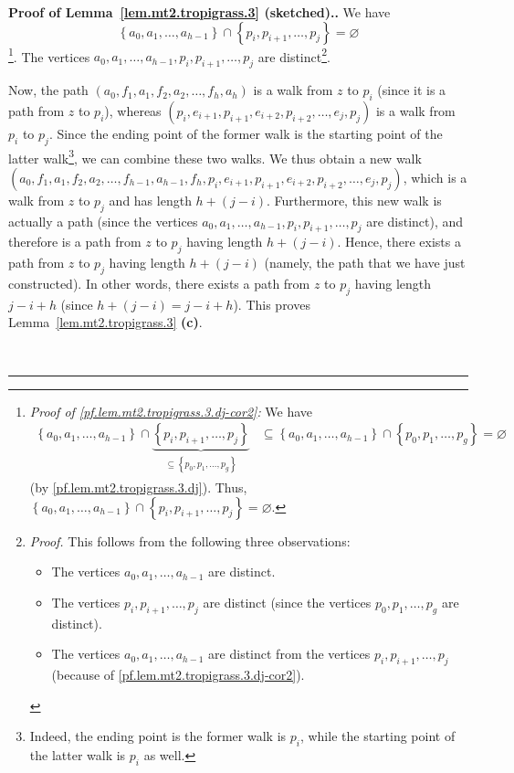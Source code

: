 \documentclass[numbers=enddot,12pt,final,onecolumn,notitlepage]{scrartcl}%
\theoremstyle{definition}
\newenvironment{proof}[1][Proof]{\noindent\textbf{#1.} }{\ \rule{0.5em}{0.5em}}
\newcommand{\set}[1]{\left\{ #1 \right\}}
\newcommand{\tup}[1]{\left( #1 \right)}
\newcommand{\underbrack}[2]{\underbrace{#1}_{\substack{#2}}}
\begin{document}
\begin{proof}[Proof of Lemma~\ref{lem.mt2.tropigrass.3} (sketched).]
We have
\begin{equation}
\set{a_0, a_1, \ldots, a_{h-1}} \cap \set{p_i, p_{i+1}, \ldots, p_j}
= \varnothing
\label{pf.lem.mt2.tropigrass.3.dj-cor2}
\end{equation}
\footnote{\textit{Proof of \eqref{pf.lem.mt2.tropigrass.3.dj-cor2}:}
  We have
  \begin{align*}
  \set{a_0, a_1, \ldots, a_{h-1}}
  \cap
  \underbrack{\set{p_i, p_{i+1}, \ldots, p_j}}
             {\subseteq \set{p_0, p_1, \ldots, p_g}}
  & \subseteq
  \set{a_0, a_1, \ldots, a_{h-1}} \cap \set{p_0, p_1, \ldots, p_g}
  = \varnothing
  \end{align*}
  (by \eqref{pf.lem.mt2.tropigrass.3.dj}).
  Thus,
  $\set{a_0, a_1, \ldots, a_{h-1}}
     \cap \set{p_i, p_{i+1}, \ldots, p_j}
  = \varnothing$. }.
The vertices
$a_0, a_1, \ldots, a_{h-1}, p_i, p_{i+1}, \ldots, p_j$
are distinct\footnote{\textit{Proof.}
  This follows from the following three observations:
  \begin{itemize}
  \item The vertices $a_0, a_1, \ldots, a_{h-1}$ are
        distinct.
  \item The vertices $p_i, p_{i+1}, \ldots, p_j$ are distinct
        (since the vertices $p_0, p_1, \ldots, p_g$ are
        distinct).
  \item The vertices $a_0, a_1, \ldots, a_{h-1}$ are distinct
        from the vertices $p_i, p_{i+1}, \ldots, p_j$
        (because of \eqref{pf.lem.mt2.tropigrass.3.dj-cor2}).
  \end{itemize}
  }.

Now, the path
$\tup{a_0, f_1, a_1, f_2, a_2, \ldots, f_h, a_h}$
is a walk from $z$ to $p_i$
(since it is a path from $z$ to $p_i$), whereas
$\tup{p_i, e_{i+1}, p_{i+1}, e_{i+2}, p_{i+2}, \ldots, e_j, p_j}$
is a walk from $p_i$ to $p_j$.
Since the ending point of the former walk is the starting
point of the latter walk\footnote{Indeed, the ending point is the
    former walk is $p_i$, while the starting point of the latter
    walk is $p_i$ as well.},
we can combine these two walks.
We thus obtain a new walk \newline
$\tup{a_0, f_1, a_1, f_2, a_2, \ldots, f_{h-1}, a_{h-1}, f_h,
      p_i, e_{i+1}, p_{i+1}, e_{i+2}, p_{i+2}, \ldots, e_j, p_j}$,
which is a walk from $z$ to $p_j$ and has length
$h + \tup{j-i}$.
Furthermore, this new walk is actually a path
(since the vertices
$a_0, a_1, \ldots, a_{h-1}, p_i, p_{i+1}, \ldots, p_j$
are distinct),
and therefore is a path from $z$ to $p_j$ having length
$h + \tup{j-i}$.
Hence, there exists a path from $z$ to $p_j$ having
length $h + \tup{j-i}$ (namely, the path that we have just
constructed).
In other words, there exists a path from $z$ to $p_j$ having
length $j - i + h$ (since $h + \tup{j-i} = j - i + h$).
This proves Lemma~\ref{lem.mt2.tropigrass.3} \textbf{(c)}.


\end{proof}
\end{document}
